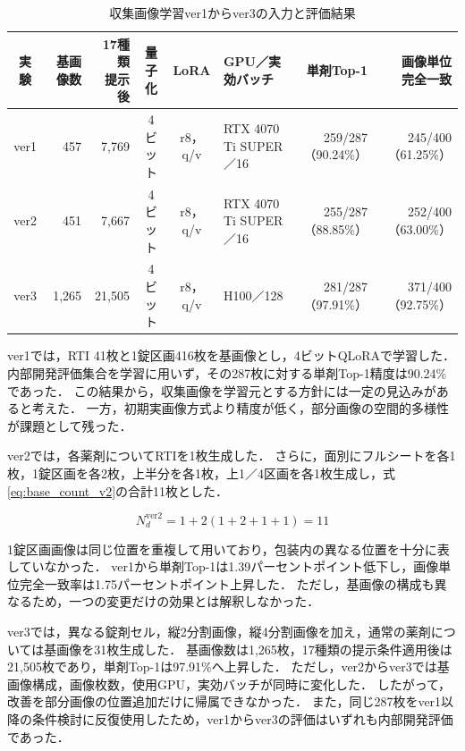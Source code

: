 \documentclass[uplatex,dvipdfmx]{jsarticle}
\begin{document}
\begin{table}[H]
  \centering
  \caption{収集画像学習ver1からver3の入力と評価結果}
  \label{tab:web_v1_v3}
  \scriptsize
  \setlength{\tabcolsep}{2pt}
  \begin{tabular}{|c|r|r|c|c|p{2.7cm}|r|r|}
    \hline
    実験 & 基画像数 & \shortstack{17種類\\提示後} & 量子化 & LoRA & GPU／実効バッチ & 単剤Top-1 & \shortstack{画像単位\\完全一致} \\ \hline
    ver1 & 457 & 7,769 & 4ビット & r8，q/v & RTX 4070 Ti SUPER／16 & 259/287（90.24\%） & 245/400（61.25\%） \\ \hline
    ver2 & 451 & 7,667 & 4ビット & r8，q/v & RTX 4070 Ti SUPER／16 & 255/287（88.85\%） & 252/400（63.00\%） \\ \hline
    ver3 & 1,265 & 21,505 & 4ビット & r8，q/v & H100／128 & 281/287（97.91\%） & 371/400（92.75\%） \\ \hline
  \end{tabular}
\end{table}

ver1では，RTI 41枚と1錠区画416枚を基画像とし，4ビットQLoRAで学習した．
内部開発評価集合を学習に用いず，その287枚に対する単剤Top-1精度は90.24\%であった．
この結果から，収集画像を学習元とする方針には一定の見込みがあると考えた．
一方，初期実画像方式より精度が低く，部分画像の空間的多様性が課題として残った．

ver2では，各薬剤についてRTIを1枚生成した．
さらに，面別にフルシートを各1枚，1錠区画を各2枚，上半分を各1枚，上1／4区画を各1枚生成し，式\eqref{eq:base_count_v2}の合計11枚とした．

\begin{equation}
  N^{\mathrm{ver2}}_d = 1 + 2(1 + 2 + 1 + 1) = 11
  \label{eq:base_count_v2}
\end{equation}

1錠区画画像は同じ位置を重複して用いており，包装内の異なる位置を十分に表していなかった．
ver1から単剤Top-1は1.39パーセントポイント低下し，画像単位完全一致率は1.75パーセントポイント上昇した．
ただし，基画像の構成も異なるため，一つの変更だけの効果とは解釈しなかった．

ver3では，異なる錠剤セル，縦2分割画像，縦4分割画像を加え，通常の薬剤については基画像を31枚生成した．
基画像数は1,265枚，17種類の提示条件適用後は21,505枚であり，単剤Top-1は97.91\%へ上昇した．
ただし，ver2からver3では基画像構成，画像枚数，使用GPU，実効バッチが同時に変化した．
したがって，改善を部分画像の位置追加だけに帰属できなかった．
また，同じ287枚をver1以降の条件検討に反復使用したため，ver1からver3の評価はいずれも内部開発評価であった．
\end{document}
